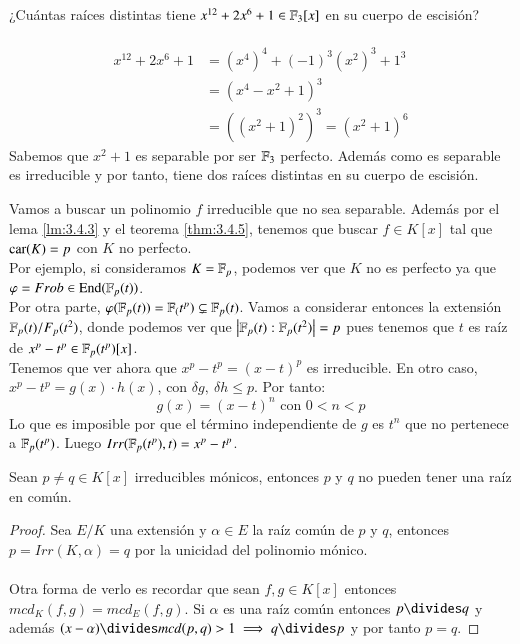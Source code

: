 \begin{ex}[H3.16]
    ¿Cuántas raíces distintas tiene $x^{12} + 2x^6 + 1 \in \mathbb{F}_3[x]$ en su cuerpo de escisión?\\\\

    \begin{align*}
        x^{12} + 2x^6 + 1 &= (x^4)^4 + (-1)^3 (x^2)^3 + 1^3\\
                          &= (x^4 -x^2 +1) ^3\\
                          &= ((x^2 + 1)^2)^3 = (x^2 + 1)^6
    \end{align*}
    Sabemos que $x^2 + 1$ es separable por ser $\mathbb{F}_3$ perfecto. Además como es separable es irreducible y por tanto, tiene dos raíces distintas en su cuerpo de escisión.
\end{ex}

\begin{eg}
    Vamos a buscar un polinomio $f$ irreducible que no sea separable. Además por el lema \ref{lm:3.4.3} y el teorema \ref{thm:3.4.5}, tenemos que buscar $f \in K[x]$ tal que $\mathrm{car}(K) = p$ con $K$ no perfecto.\\
    Por ejemplo, si consideramos $K = \mathbb{F}_p$, podemos ver que $K$ no es perfecto ya que $\varphi = Frob \in \mathrm{End}(\mathbb{F}_p(t))$.\\
    Por otra parte, $\varphi(\mathbb{F}_p(t)) = \mathbb{F}_(t^p) \subsetneq \mathbb{F}_p(t)$. Vamos a considerar entonces la extensión $\mathbb{F}_p(t)/F_p(t^2)$, donde podemos ver que $\left|\mathbb{F}_p(t) : \mathbb{F}_p(t^2)\right| = p$ pues tenemos que $t$ es raíz de $x^p - t^p \in \mathbb{F}_p(t^p)[x]$.\\

    Tenemos que ver ahora que $x^p - t^p = (x - t)^p$ es irreducible. En otro caso, $x^p - t^p = g(x) \cdot h(x)$, con $\delta g,\ \delta h \leq p$. Por tanto:
    $$
        g(x) = (x - t)^n \text{ con } 0 < n < p
    $$
    Lo que es imposible por que el término independiente de $g$ es $t^n$ que no pertenece a $\mathbb{F}_p(t^p)$. Luego $Irr(\mathbb{F}_p(t^p), t) = x^p - t^p$.
\end{eg}

\begin{pro}
    Sean $p \neq q \in K[x]$ irreducibles mónicos, entonces $p$ y $q$ no pueden tener una raíz en común.
\end{pro}

\begin{proof}
    Sea $E/K$ una extensión y $\alpha \in E$ la raíz común de $p$ y $q$, entonces $p = Irr(K, \alpha) = q$ por la unicidad del polinomio mónico.\\\\
    Otra forma de verlo es recordar que sean $f, g \in K[x]$ entonces $mcd_K(f, g) = mcd_E(f, g)$. Si $\alpha$ es una raíz común entonces $p \divides q$ y además $(x - \alpha) \divides mcd(p, q) > 1 \implies q \divides p$ y por tanto $p = q$.
\end{proof}

